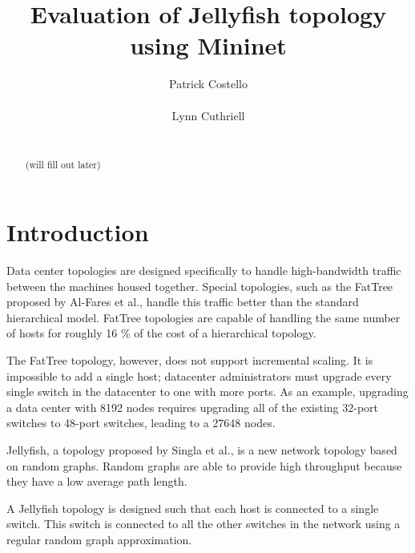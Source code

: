 \documentclass{acm_proc_article-sp}
\begin{document}
\title{Evaluation of Jellyfish topology using Mininet}

\author{
  \alignauthor
    Patrick Costello\\
    \\
  \alignauthor
    Lynn Cuthriell\\
    \\
}

\maketitle
\begin{abstract}
(will fill out later)
\end{abstract}



\section{Introduction}

Data center topologies are designed specifically to handle high-bandwidth traffic
between the machines housed together. Special topologies, such as the FatTree 
proposed by Al-Fares et al., handle this traffic better than the standard 
hierarchical model. FatTree topologies are capable of handling the same number of 
hosts for roughly 16 \% of the cost of a hierarchical topology. \cite{fattree}

The FatTree topology, however, does not support incremental scaling. It is impossible
to add a single host; datacenter administrators must upgrade every single
switch in the datacenter to one with more ports. As an example, upgrading a data
center with 8192 nodes requires upgrading all of the existing 32-port switches
to 48-port switches, leading to a 27648 nodes. \cite{jellyfish}


Jellyfish, a topology proposed by Singla et al., is a new network topology
based on random graphs. Random graphs are able to provide high throughput 
because they have a low average path length. \cite{jellyfish}

A Jellyfish topology is designed such that each host is connected to a single 
switch. This switch is connected to all the other switches in the network using 
a regular random graph approximation.
\end{document}
